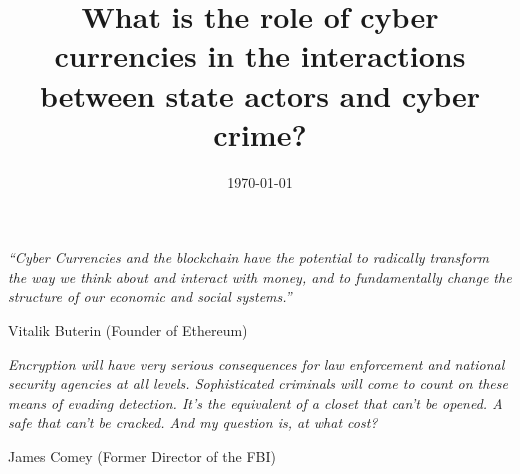\documentclass[a4paper, 11pt, oneside]{Thesis}  %
\begin{document}
\frontmatter      %

\title  {What is the role of cyber currencies in the interactions between state actors and cyber crime?}
\addresses  {\groupname\\\deptname\\\univname}  %
\date       {\today}
\subject    {}
\keywords   {}

\maketitle


\fancyhead{}  %
\rhead{\thepage}  %
\lhead{}  %

\pagestyle{fancy}  %

\pagestyle{empty}  %

\null\vfill
\textit{“Cyber Currencies and the blockchain have the potential to radically transform the way we think about and interact with money, and to fundamentally change the structure of our economic and social systems.”}

\begin{flushright}
Vitalik Buterin (Founder of Ethereum)
\end{flushright}

\null\vfill
\textit{Encryption will have very serious consequences for law enforcement and national security agencies at all levels. Sophisticated criminals will come to count on these means of evading detection. It’s the equivalent of a closet that can’t be opened. A safe that can’t be cracked. And my question is, at what cost?}

\begin{flushright}
James Comey (Former Director of the FBI)
\end{flushright}
\end{document}
